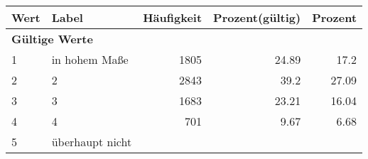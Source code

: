      \begin{longtable}{lXrrr}
     \toprule
     \textbf{Wert} & \textbf{Label} & \textbf{Häufigkeit} & \textbf{Prozent(gültig)} & \textbf{Prozent} \\
     \endhead
     \midrule
     \multicolumn{5}{l}{\textbf{Gültige Werte}}\\

     1 &
     \multicolumn{1}{X}{ in hohem Maße   } &


       \num{1805} &
       \num[round-mode=places,round-precision=2]{24,89} &
         \num[round-mode=places,round-precision=2]{17,2} \\

     2 &
     \multicolumn{1}{X}{ 2   } &


       \num{2843} &
       \num[round-mode=places,round-precision=2]{39,2} &
         \num[round-mode=places,round-precision=2]{27,09} \\

     3 &
     \multicolumn{1}{X}{ 3   } &


       \num{1683} &
       \num[round-mode=places,round-precision=2]{23,21} &
         \num[round-mode=places,round-precision=2]{16,04} \\

     4 &
     \multicolumn{1}{X}{ 4   } &


       \num{701} &
       \num[round-mode=places,round-precision=2]{9,67} &
         \num[round-mode=places,round-precision=2]{6,68} \\

     5 &
     \multicolumn{1}{X}{ überhaupt nicht   } &



\end{longtable}
